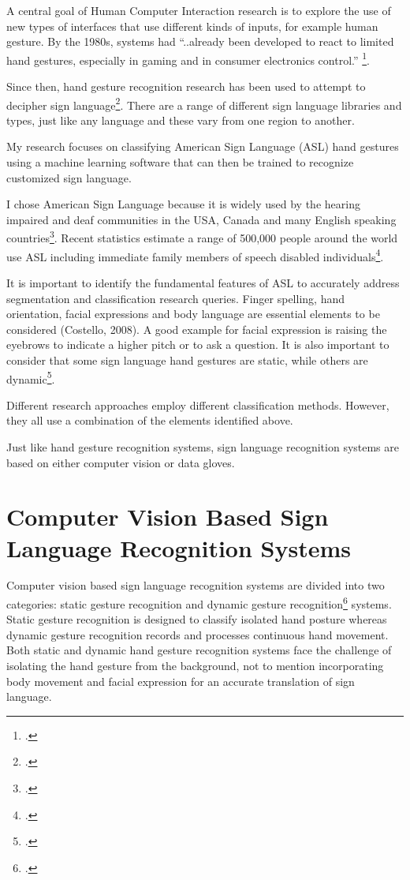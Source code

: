 A central goal of Human Computer Interaction research is to explore the use of new types of interfaces that use different kinds of inputs, for example human gesture. By the 1980s, systems had ``..already been developed to react to limited hand gestures, especially in gaming and in consumer electronics control.'' \footcite{Premaratne2007}.

Since then, hand gesture recognition research has been used to attempt to decipher sign language\footcite{Kawai1985}. There are a range of different sign language libraries and types, just like any language and these vary from one region to another.

My research focuses on classifying American Sign Language (ASL) hand gestures using a machine learning software that can then be trained to recognize customized sign language. 

I chose American Sign Language because it is widely used by the hearing impaired and deaf communities in the USA, Canada and many English speaking countries\footcite{Padden2011}. Recent statistics estimate a range of 500,000 people around the world use ASL including immediate family members of speech disabled individuals\footcite{Neidle1998}.

It is important to identify the fundamental features of ASL to accurately address segmentation and classification research queries. Finger spelling, hand orientation, facial expressions and body language are essential elements to be considered (Costello, 2008). A good example for facial expression is raising the eyebrows to indicate a higher pitch or to ask a question. It is also important to consider that some sign language hand gestures are static, while others are dynamic\footcite{Armstrong2009}. 

Different research approaches employ different classification methods. However, they all use a combination of the elements identified above.

Just like hand gesture recognition systems, sign language recognition systems are based on either computer vision or data gloves.

\section{Computer Vision Based Sign Language Recognition Systems}

Computer vision based sign language recognition systems are divided into two categories: static gesture recognition and dynamic gesture recognition\footcite{Waldron1995} systems. Static gesture recognition is designed to classify isolated hand posture whereas dynamic gesture recognition records and processes continuous hand movement. Both static and dynamic hand gesture recognition systems face the challenge of isolating the hand gesture from the background, not to mention incorporating body movement and facial expression for an accurate translation of sign language.

